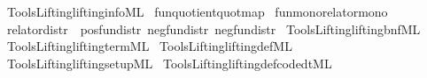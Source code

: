\begin{isabellebody}
%
\isadelimML
%
\endisadelimML
%
\isatagML
{}\isamarkupfalse%
\ {\isacartoucheopen}Tools{\isacharslash}{\kern0pt}Lifting{\isacharslash}{\kern0pt}lifting{\isacharunderscore}{\kern0pt}info{\isachardot}{\kern0pt}ML{\isacartoucheclose}%
\endisatagML
{\isafoldML}%
%
\isadelimML
\isanewline
%
\endisadelimML
\isanewline
\isanewline
{}\isamarkupfalse%
\ fun{\isacharunderscore}{\kern0pt}quotient{\isacharbrackleft}{\kern0pt}quot{\isacharunderscore}{\kern0pt}map{\isacharbrackright}{\kern0pt}\isanewline
{}\isamarkupfalse%
\ fun{\isacharunderscore}{\kern0pt}mono{\isacharbrackleft}{\kern0pt}relator{\isacharunderscore}{\kern0pt}mono{\isacharbrackright}{\kern0pt}\isanewline
{}\isamarkupfalse%
\ {\isacharbrackleft}{\kern0pt}relator{\isacharunderscore}{\kern0pt}distr{\isacharbrackright}{\kern0pt}\ {\isacharequal}{\kern0pt}\ pos{\isacharunderscore}{\kern0pt}fun{\isacharunderscore}{\kern0pt}distr\ neg{\isacharunderscore}{\kern0pt}fun{\isacharunderscore}{\kern0pt}distr{}\ neg{\isacharunderscore}{\kern0pt}fun{\isacharunderscore}{\kern0pt}distr{}\isanewline
%
\isadelimML
\isanewline
%
\endisadelimML
%
\isatagML
{}\isamarkupfalse%
\ {\isacartoucheopen}Tools{\isacharslash}{\kern0pt}Lifting{\isacharslash}{\kern0pt}lifting{\isacharunderscore}{\kern0pt}bnf{\isachardot}{\kern0pt}ML{\isacartoucheclose}\isanewline
{}\isamarkupfalse%
\ {\isacartoucheopen}Tools{\isacharslash}{\kern0pt}Lifting{\isacharslash}{\kern0pt}lifting{\isacharunderscore}{\kern0pt}term{\isachardot}{\kern0pt}ML{\isacartoucheclose}\isanewline
{}\isamarkupfalse%
\ {\isacartoucheopen}Tools{\isacharslash}{\kern0pt}Lifting{\isacharslash}{\kern0pt}lifting{\isacharunderscore}{\kern0pt}def{\isachardot}{\kern0pt}ML{\isacartoucheclose}\isanewline
{}\isamarkupfalse%
\ {\isacartoucheopen}Tools{\isacharslash}{\kern0pt}Lifting{\isacharslash}{\kern0pt}lifting{\isacharunderscore}{\kern0pt}setup{\isachardot}{\kern0pt}ML{\isacartoucheclose}\isanewline
{}\isamarkupfalse%
\ {\isacartoucheopen}Tools{\isacharslash}{\kern0pt}Lifting{\isacharslash}{\kern0pt}lifting{\isacharunderscore}{\kern0pt}def{\isacharunderscore}{\kern0pt}code{\isacharunderscore}{\kern0pt}dt{\isachardot}{\kern0pt}ML{\isacartoucheclose}%
\endisatagML
{\isafoldML}%
%
\isadelimML
\isanewline
%
\endisadelimML
\isanewline

\end{isabellebody}
